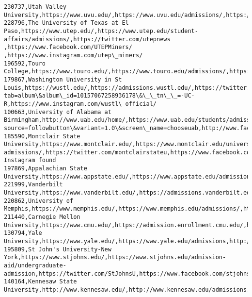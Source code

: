 \documentclass[11pt]{article}
\begin{document}
\begin{Verbatim}[commandchars=\\\{\}]
230737,Utah Valley University,https://www.uvu.edu/,https://www.uvu.edu/admissions/,https://twitter.com/UVU,https://www.facebook.com/UtahValleyUniversity/videos/315719132547332/,https://www.instagram.com/utah.valley.university/
228796,The University of Texas at El Paso,https://www.utep.edu/,https://www.utep.edu/student-affairs/admissions/,https://twitter.com/utepnews ,https://www.facebook.com/UTEPMiners/ ,https://www.instagram.com/utep\_miners/ 
196592,Touro College,https://www.touro.edu/,https://www.touro.edu/admissions/,https://twitter.com/WeAreTouro,https://www.facebook.com/WeAreTouro,https://instagram.com/WeAreTouro
179867,Washington University in St Louis,https://wustl.edu/,https://admissions.wustl.edu/,https://twitter.com/wustl/,https://www.facebook.com/pg/wustl/photos/?tab=album\&album\_id=10157067258936178\&\_\_tn\_\_=-UC-R,https://www.instagram.com/wustl\_official/
100663,University of Alabama at Birmingham,http://www.uab.edu/home/,https://www.uab.edu/students/admissions/,http://twitter.com/intent/follow?source=followbutton\&variant=1.0\&screen\_name=chooseuab,http://www.facebook.com/chooseuab,https://www.instagram.com/uabarts
185590,Montclair State University,https://www.montclair.edu/,https://www.montclair.edu/university-admissions/,https://twitter.com/montclairstateu,https://www.facebook.com/MontclairStateUniversity,No Instagram found
197869,Appalachian State University,https://www.appstate.edu/,https://www.appstate.edu/admissions/,https://twitter.com/appstate,https://www.facebook.com/appalachianstateuniversity,https://instagram.com/appstate/
221999,Vanderbilt University,https://www.vanderbilt.edu/,https://admissions.vanderbilt.edu/,http://twitter.com/vanderbiltu,http://facebook.com/vanderbilt,http://instagram.com/vanderbiltu
220862,University of Memphis,https://www.memphis.edu/,https://www.memphis.edu/admissions/,https://twitter.com/uofmemphis,https://www.facebook.com/uofmemphis,https://www.instagram.com/uofmemphis/
211440,Carnegie Mellon University,https://www.cmu.edu/,https://admission.enrollment.cmu.edu/,http://www.twitter.com/carnegiemellon,http://www.facebook.com/carnegiemellonu,https://instagram.com/carnegiemellon/
130794,Yale University,https://www.yale.edu/,https://www.yale.edu/admissions,http://www.twitter.com/yale,https://www.facebook.com/YaleUniversity,//instagram.com/yale/
195809,St John's University-New York,https://www.stjohns.edu/,https://www.stjohns.edu/admission-aid/undergraduate-admission,https://twitter.com/StJohnsU,https://www.facebook.com/stjohnsu/,https://www.instagram.com/stjohnsu/
140164,Kennesaw State University,http://www.kennesaw.edu/,http://www.kennesaw.edu/admissions.php,https://twitter.com/kennesawstate,https://www.facebook.com/KennesawStateUniversity,https://instagram.com/kennesawstateuniversity

\end{Verbatim}
\end{document}
